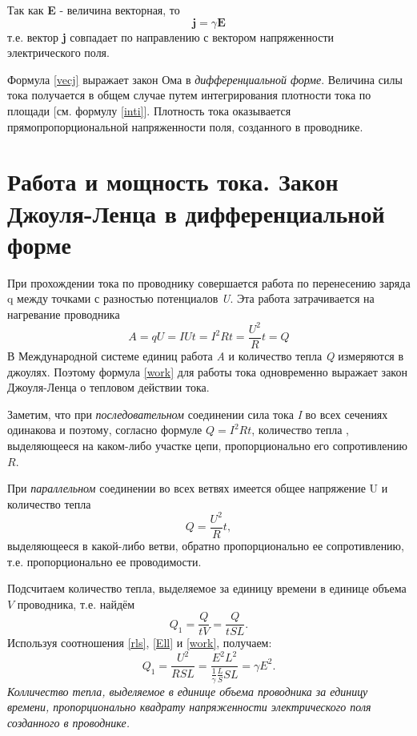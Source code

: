 \documentclass[a4paper,10pt]{book}
\let\vec\mathbf
\begin{document}
Так как \textbf{E} - величина векторная, то
\begin{equation}\label{vecj}
 \vec{j} = \gamma\vec{E}
\end{equation}
т.е. вектор \textbf{j} совпадает по направлению с вектором напряженности электрического поля.

Формула \ref{vecj} выражает закон Ома в \emph{дифференциальной форме}. Величина силы тока получается в общем случае путем интегрирования
плотности тока по площади [см. формулу \ref{inti}]. Плотность тока оказывается прямопропорциональной напряженности поля, созданного в проводнике.
\section{Работа и мощность тока. Закон Джоуля-Ленца в дифференциальной форме}
При прохождении тока по проводнику совершается работа по перенесению заряда q между точками с разностью потенциалов \emph{U}. Эта работа 
затрачивается на нагревание проводника
\begin{equation}\label{work}
 A = qU = IUt = I^2Rt = \frac{U^2}{R}t = Q
\end{equation}
В Международной системе единиц работа \emph{A} и количество тепла \emph{Q} измеряются в джоулях. Поэтому формула \ref{work} для работы 
тока одновременно выражает закон Джоуля-Ленца о тепловом действии тока. 

Заметим, что при \emph{последовательном} соединении сила тока \emph{I} во всех сечениях одинакова и поэтому, согласно формуле $Q = I^2Rt$,
количество тепла , выделяющееся на каком-либо участке цепи, пропорционально его сопротивлению $R$.

При \emph{параллельном} соединении во всех ветвях имеется общее напряжение U и количество тепла
\begin{equation}
 Q = \frac{U^2}{R}t, \nonumber
\end{equation}
выделяющееся в какой-либо ветви, обратно пропорционально ее сопротивлению, т.е. пропорционально ее проводимости.

Подсчитаем количество тепла, выделяемое за единицу времени в единице объема $V$ проводника, т.е. найдём 
\begin{equation}
 Q_1 = \frac{Q}{tV} = \frac{Q}{tSL}. \nonumber
\end{equation}
Используя соотношения \ref{rls}, \ref{Ell} и \ref{work}, получаем:
\begin{equation}\label{warm}
 Q_1 = \frac{U^2}{RSL} = \frac{E^2L^2}{\frac{1}{\gamma}\frac{L}{S}SL} = \gamma E^2.
\end{equation}
\emph{Колличество тепла, выделяемое в единице объема проводника за единицу времени, пропорционально квадрату напряженности электрического поля созданного в проводнике.}
\end{document}
